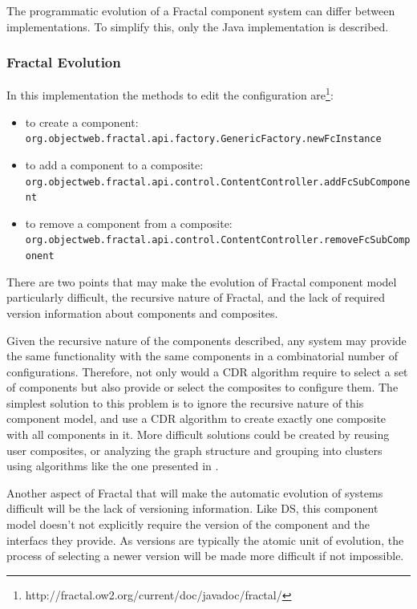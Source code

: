The programmatic evolution of a Fractal component system can differ between implementations.
To simplify this, only the Java implementation is described. 

\subsubsection{Fractal Evolution}
In this implementation the methods to edit the configuration are\footnote{http://fractal.ow2.org/current/doc/javadoc/fractal/}:
\begin{itemize}
  \item to create a component: \verb+org.objectweb.fractal.api.factory.GenericFactory.newFcInstance+
  \item to add a component to a composite: \verb+org.objectweb.fractal.api.control.ContentController.addFcSubComponent+
  \item to remove a component from a composite: \verb+org.objectweb.fractal.api.control.ContentController.removeFcSubComponent+
\end{itemize}

There are two points that may make the evolution of Fractal component model particularly difficult,
the recursive nature of Fractal, and the lack of required version information about components and composites.

Given the recursive nature of the components described, any system may provide the same functionality with the same components in a combinatorial number of configurations.
Therefore, not only would a CDR algorithm require to select a set of components but also provide or select the composites to configure them.
The simplest solution to this problem is to ignore the recursive nature of this component model,
and use a CDR algorithm to create exactly one composite with all components in it.
More difficult solutions could be created by reusing user composites, or analyzing the graph structure and grouping into clusters using algorithms like the one presented in \cite{dietrich2008cluster}.

Another aspect of Fractal that will make the automatic evolution of systems difficult will be the lack of versioning information.
Like DS, this component model doesn't not explicitly require the version of the component and the interfacs they provide.
As versions are typically the atomic unit of evolution, the process of selecting a newer version will be made more difficult if not impossible. 

